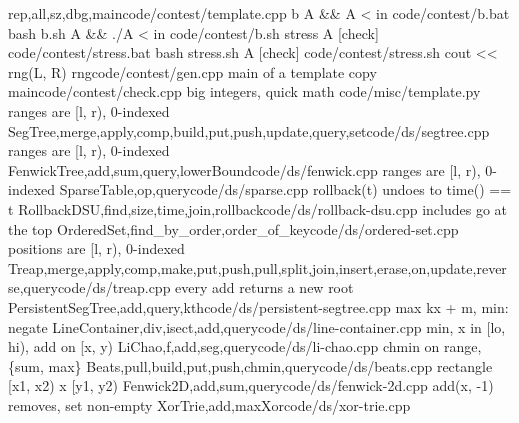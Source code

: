   {}
  {rep,all,sz,dbg,main}{code/contest/template.cpp}
  {b A \&\& A < in}
  {}{code/contest/b.bat}
  {bash b.sh A \&\& ./A < in}
  {}{code/contest/b.sh}
  {stress A [check]}
  {}{code/contest/stress.bat}
  {bash stress.sh A [check]}
  {}{code/contest/stress.sh}
  {cout {<}{<} rng(L, R)}
  {rng}{code/contest/gen.cpp}
  {main of a template copy}
  {main}{code/contest/check.cpp}
  {big integers, quick math}
  {}{code/misc/template.py}
  {ranges are [l, r), 0-indexed}
  {SegTree,merge,apply,comp,build,put,push,update,query,set}{code/ds/segtree.cpp}
  {ranges are [l, r), 0-indexed}
  {FenwickTree,add,sum,query,lowerBound}{code/ds/fenwick.cpp}
  {ranges are [l, r), 0-indexed}
  {SparseTable,op,query}{code/ds/sparse.cpp}
  {rollback(t) undoes to time() == t}
  {RollbackDSU,find,size,time,join,rollback}{code/ds/rollback-dsu.cpp}
  {includes go at the top}
  {OrderedSet,find_by_order,order_of_key}{code/ds/ordered-set.cpp}
  {positions are [l, r), 0-indexed}
  {Treap,merge,apply,comp,make,put,push,pull,split,join,insert,erase,on,update,reverse,query}{code/ds/treap.cpp}
  {every add returns a new root}
  {PersistentSegTree,add,query,kth}{code/ds/persistent-segtree.cpp}
  {max kx + m, min: negate}
  {LineContainer,div,isect,add,query}{code/ds/line-container.cpp}
  {min, x in [lo, hi), add on [x, y)}
  {LiChao,f,add,seg,query}{code/ds/li-chao.cpp}
  {chmin on range, \{sum, max\}}
  {Beats,pull,build,put,push,chmin,query}{code/ds/beats.cpp}
  {rectangle [x1, x2) x [y1, y2)}
  {Fenwick2D,add,sum,query}{code/ds/fenwick-2d.cpp}
  {add(x, -1) removes, set non-empty}
  {XorTrie,add,maxXor}{code/ds/xor-trie.cpp}
